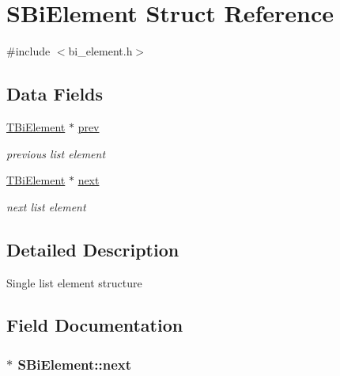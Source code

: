 \hypertarget{structSBiElement}{\section{\-S\-Bi\-Element \-Struct \-Reference}
\label{structSBiElement}
}


{\ttfamily \#include $<$bi\-\_\-element.\-h$>$}

\subsection*{\-Data \-Fields}
\begin{DoxyCompactItemize}
\item 
\hyperlink{bi__element_8h_a50efceeb7874dfcc17d3efc7e4ec90ca}{\-T\-Bi\-Element} $\ast$ \hyperlink{structSBiElement_ad2e6848f39a13f0608ea5bb1f1f24ef1}{prev}
\begin{DoxyCompactList}\small\item\em previous list element \end{DoxyCompactList}\item 
\hyperlink{bi__element_8h_a50efceeb7874dfcc17d3efc7e4ec90ca}{\-T\-Bi\-Element} $\ast$ \hyperlink{structSBiElement_a66428d91c4bf757af930ca4094f41ad9}{next}
\begin{DoxyCompactList}\small\item\em next list element \end{DoxyCompactList}\end{DoxyCompactItemize}


\subsection{\-Detailed \-Description}
\-Single list element structure 

\subsection{\-Field \-Documentation}
\hypertarget{structSBiElement_a66428d91c4bf757af930ca4094f41ad9}{
\subsubsection[{next}]{$\ast$ {\bf \-S\-Bi\-Element\-::next}}}\label{structSBiElement_a66428d91c4bf757af930ca4094f41ad9}


